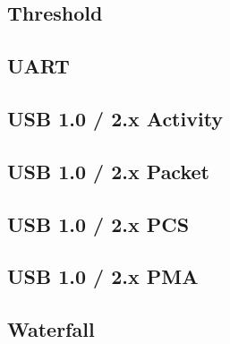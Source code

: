 \documentclass[11pt]{article}
\begin{document}
\subsection{Threshold}
\subsection{UART}
\subsection{USB 1.0 / 2.x Activity}
\subsection{USB 1.0 / 2.x Packet}
\subsection{USB 1.0 / 2.x PCS}
\subsection{USB 1.0 / 2.x PMA}
\subsection{Waterfall}
\end{document}
